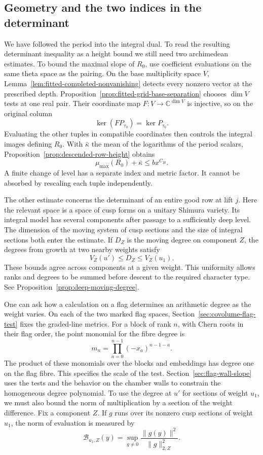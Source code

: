 \subsection{Geometry and the two indices in the determinant}

We have followed the period into the integral dual. To read the resulting determinant
inequality as a height bound we still need two archimedean estimates. To bound the maximal slope of \(R_0\), use coefficient evaluations on the same theta space as the pairing. On the base multiplicity space \(V\), Lemma~\ref{lem:fitted-completed-nonvanishing}
detects every nonzero vector at the prescribed depth. Proposition~\ref{prop:fitted-grid-base-separation}
chooses \(\dim V\) tests at one real pair. Their coordinate map
\(F:V\to\mathbb C^{\dim V}\) is injective, so on the original column
\[
                  \ker(FP_{\tau_0})=\ker P_{\tau_0}.
\] Evaluating the other tuples in compatible coordinates then controls the integral images defining \(R_0\). With \(\bar\kappa\) the mean of the logarithms of the period scalars, Proposition~\ref{prop:descended-row-height} obtains
\[
                         \mu_{\max}(R_0)+\bar\kappa\le b x^{C_H}.
\]
A finite change of level has a separate index and metric factor. It cannot be absorbed by rescaling each tuple independently.

The other estimate concerns the determinant of an entire good row at lift \(j\). Here the relevant space is a space of cusp forms on a unitary Shimura variety. Its integral model has several components after passage to a sufficiently deep level. The dimension of the moving system of cusp sections and the size of integral sections both enter the estimate. If \(D_Z\) is the moving degree on component \(Z\), the degrees from growth at two nearby weights satisfy
\[
                       V_Z(u')\le D_Z\le V_Z(u_1).
\] These bounds agree across components at a given weight. This uniformity allows ranks and degrees to be summed before descent to the required character type. See Proposition~\ref{prop:deep-moving-degree}.

One can ask how a calculation on a flag determines an arithmetic
degree as the weight varies. On each of the two marked flag spaces,
Section~\ref{sec:covolume-flag-test} fixes the graded-line metrics.
For a block of rank \(n\), with Chern roots in their flag order, the
point monomial for the fibre degree is
\[
               m_n=\prod_{a=0}^{n-1}(-x_a)^{n-1-a}.
\]
The product of these monomials over the blocks and embeddings has
degree one on the flag fibre. This specifies the scale of the test.
Section~\ref{sec:flag-wall-slope} uses the tests and the behavior on
the chamber walls to constrain the homogeneous degree polynomial.
To use the degree at \(u'\) for sections of weight \(u_1\), we must
also bound the norm of multiplication by a section of the weight
difference. Fix a component \(Z\). If \(g\) runs over its nonzero cusp
sections of weight \(u_1\), the norm of evaluation is measured by
\[
      \mathcal B_{u_1,Z}(y)
      =\sup_{g\ne0}\frac{\|g(y)\|^2}{\|g\|_{2,Z}^2}.
\]

